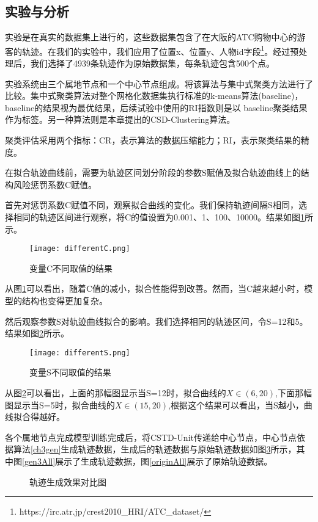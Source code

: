 \subsection{实验与分析}
实验是在真实的数据集上进行的，这些数据集包含了在大阪的ATC购物中心的游客的轨迹。在我们的实验中，我们应用了位置x、位置y、人物id字段\footnote[1]{https://irc.atr.jp/crest2010_HRI/ATC_dataset/}。经过预处理后，我们选择了4939条轨迹作为原始数据集，每条轨迹包含500个点。

实验系统由三个属地节点和一个中心节点组成。将该算法与集中式聚类方法进行了比较。集中式聚类算法对整个网格化数据集执行标准的k-means算法(baseline)， baseline的结果视为最优结果，后续试验中使用的RI指数则是以 baseline聚类结果作为标签。另一种算法则是本章提出的CSD-Clustering算法。

聚类评估采用两个指标：CR，表示算法的数据压缩能力；RI，表示聚类结果的精度。

在拟合轨迹曲线前，需要为轨迹区间划分阶段的参数S赋值及拟合轨迹曲线上的结构风险惩罚系数C赋值。

首先对惩罚系数C赋值不同，观察拟合曲线的变化。我们保持轨迹间隔S相同，选择相同的轨迹区间进行观察，将C的值设置为0.001、1、100、10000。结果如图\ref{differentC}所示。
\begin{figure}[H]
	\texttt{[image: differentC.png]}
	\caption{变量C不同取值的结果}
	\label{differentC}
\end{figure}

从图\ref{differentC}可以看出，随着C值的减小，拟合性能得到改善。然而，当C越来越小时，模型的结构也变得更加复杂。

然后观察参数S对轨迹曲线拟合的影响。我们选择相同的轨迹区间，令S=12和5。结果如图\ref{differentS}所示。
\begin{figure}[H]
	\texttt{[image: differentS.png]}
	\caption{变量S不同取值的结果}
	\label{differentS}
\end{figure}

从图\ref{differentS}可以看出，上面的那幅图显示当S=12时，拟合曲线的$X∈(6,20)$,下面那幅图显示当S=5时，拟合曲线的$X∈(15,20)$,根据这个结果可以看出，当S越小，曲线拟合得越好。

各个属地节点完成模型训练完成后，将CSTD-Unit传递给中心节点，中心节点依据算法\ref{ch3gen}生成轨迹数据，生成后的轨迹数据与原始轨迹数据如图\ref{ch3GenAndOrigin}所示，其中图\ref{gen3All}展示了生成轨迹数据，图\ref{originAll}展示了原始轨迹数据。
\begin{figure}[H]
\caption{轨迹生成效果对比图}
\label{ch3GenAndOrigin}
\end{figure}


